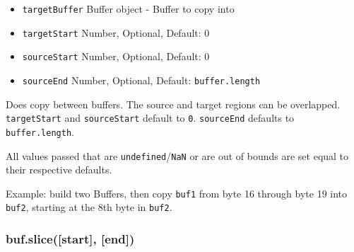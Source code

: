 \begin{itemize}
\itemsep1pt\parskip0pt
\item
  \texttt{targetBuffer} Buffer object - Buffer to copy into
\item
  \texttt{targetStart} Number, Optional, Default: 0
\item
  \texttt{sourceStart} Number, Optional, Default: 0
\item
  \texttt{sourceEnd} Number, Optional, Default: \texttt{buffer.length}
\end{itemize}

Does copy between buffers. The source and target regions can be
overlapped. \texttt{targetStart} and \texttt{sourceStart} default to
\texttt{0}. \texttt{sourceEnd} defaults to \texttt{buffer.length}.

All values passed that are \texttt{undefined}/\texttt{NaN} or are out of
bounds are set equal to their respective defaults.

Example: build two Buffers, then copy \texttt{buf1} from byte 16 through
byte 19 into \texttt{buf2}, starting at the 8th byte in \texttt{buf2}.

\begin{Shaded}
\begin{Highlighting}[]
 \NormalTok{(}\NormalTok{);}
 \NormalTok{(}\NormalTok{);}

 \NormalTok{(}   
  \NormalTok{; }
  \NormalTok{; }
\NormalTok{\}}

\NormalTok{, }\NormalTok{, }\NormalTok{);}
\NormalTok{(}\NormalTok{(}\NormalTok{, }\NormalTok{, }\NormalTok{));}

\end{Highlighting}
\end{Shaded}

\subsubsection{buf.slice({[}start{]},
{[}end{]})}\label{buf.slicestart-end}

